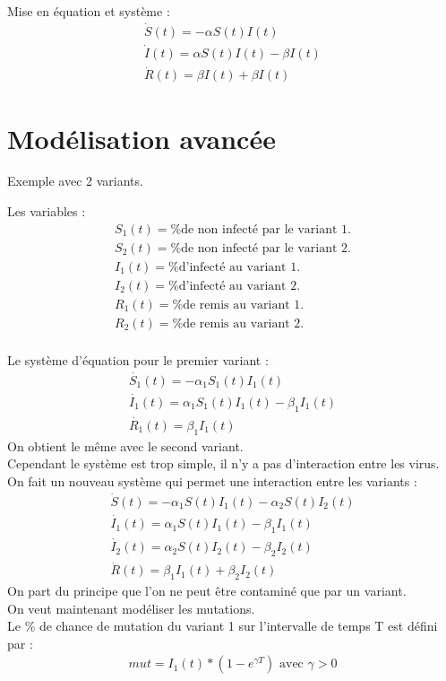 \documentclass{article}
\begin{document}
Mise en équation et système : 
\begin{align}
    \dot{S}(t)= -\alpha S(t)I(t) \\
    \dot{I}(t)= \alpha S(t)I(t)-\beta I(t) \\
    \dot{R}(t)= \beta I(t) + \beta I(t)
\end{align}

\section{Modélisation avancée}


Exemple avec 2 variants.

Les variables : 
\begin{align}
    S_1(t)= \text{\% de non infecté par le variant 1.} \\
    S_2(t)= \text{\% de non infecté par le variant 2.} \\
    I_1(t)= \text{\% d'infecté au variant 1.} \\
    I_2(t)= \text{\% d'infecté au variant 2.} \\
    R_1(t)= \text{\% de remis au variant 1.} \\
    R_2(t)= \text{\% de remis au variant 2.} \\
\end{align}

Le système d'équation pour le premier variant : 
\begin{align}
    \dot{S_1}(t)= -\alpha_1 S_1(t)I_1(t) \\
    \dot{I_1}(t)= \alpha_1 S_1(t)I_1(t)-\beta_1 I_1(t) \\
    \dot{R_1}(t)= \beta_1 I_1(t)
\end{align}
On obtient le même avec le second variant. \\
Cependant le système est trop simple, il n'y a pas d'interaction entre les virus. \\
On fait un nouveau système qui permet une interaction entre les variants :
\begin{align}
    \dot{S}(t)= -\alpha_1 S(t)I_1(t) - \alpha_2 S(t)I_2(t) \\
    \dot{I_1}(t)= \alpha_1 S(t)I_1(t)-\beta_1 I_1(t) \\
    \dot{I_2}(t)= \alpha_2 S(t)I_2(t)-\beta_2 I_2(t) \\
    \dot{R}(t)= \beta_1 I_1(t) + \beta_2 I_2(t)
\end{align}
On part du principe que l'on ne peut être contaminé que par un variant. \\
On veut maintenant modéliser les mutations.\\
Le \% de chance de mutation du variant 1 sur l'intervalle de temps T est défini par :
\begin{align}
    mut = I_1(t)*(1-e^{\gamma T})\text{ avec }\gamma > \text{0}
\end{align}
\end{document}
